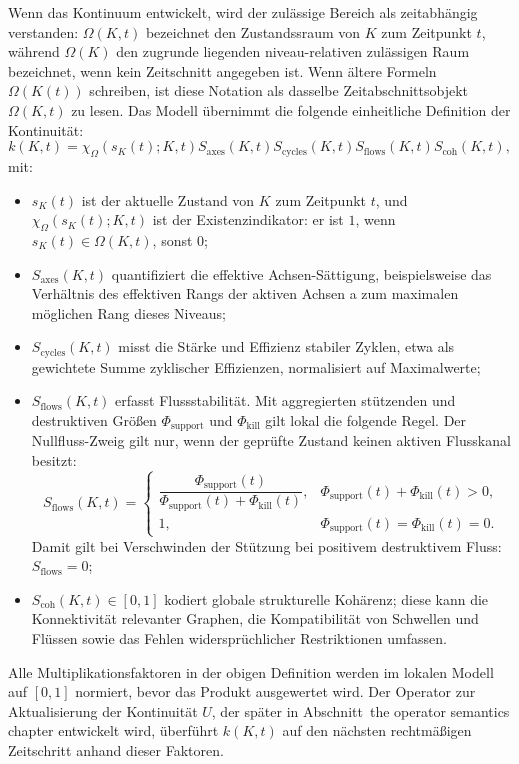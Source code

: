 Wenn das Kontinuum entwickelt, wird der zulässige Bereich als zeitabhängig
verstanden:
\(\Omega(K,t)\) bezeichnet den Zustandssraum von \(K\) zum Zeitpunkt
\(t\), während \(\Omega(K)\) den zugrunde liegenden
niveau-relativen zulässigen Raum bezeichnet, wenn kein Zeitschnitt angegeben ist.
Wenn ältere Formeln \(\Omega(K(t))\) schreiben, ist diese Notation als dasselbe
Zeitabschnittsobjekt \(\Omega(K,t)\) zu lesen.
Das Modell übernimmt die folgende einheitliche Definition der Kontinuität:
\[
    k(K,t)
    = \chi_{\Omega}(s_K(t);K,t)
      S_{\mathrm{axes}}(K,t)
      S_{\mathrm{cycles}}(K,t)
      S_{\mathrm{flows}}(K,t)
      S_{\mathrm{coh}}(K,t),
\]
mit:
\begin{itemize}
    \item \(s_K(t)\) ist der aktuelle Zustand von \(K\) zum Zeitpunkt \(t\),
          und \(\chi_{\Omega}(s_K(t);K,t)\) ist der Existenzindikator:
          er ist \(1\), wenn \(s_K(t)\in\Omega(K,t)\), sonst \(0\);
    \item \(S_{\mathrm{axes}}(K,t)\) quantifiziert die effektive Achsen-Sättigung,
          beispielsweise das Verhältnis des effektiven Rangs der aktiven Achsen
a zum maximalen möglichen Rang dieses Niveaus;
    \item \(S_{\mathrm{cycles}}(K,t)\) misst die Stärke und Effizienz stabiler
          Zyklen, etwa als gewichtete Summe zyklischer Effizienzen,
          normalisiert auf Maximalwerte;
    \item \(S_{\mathrm{flows}}(K,t)\) erfasst Flussstabilität. Mit aggregierten
          stützenden und destruktiven Größen \(\Phi_{\mathrm{support}}\) und
          \(\Phi_{\mathrm{kill}}\) gilt lokal die folgende Regel. Der
          Nullfluss-Zweig gilt nur, wenn der geprüfte Zustand keinen aktiven
          Flusskanal besitzt:
          \[
              S_{\mathrm{flows}}(K,t)=
              \begin{cases}
              \dfrac{\Phi_{\mathrm{support}}(t)}
                    {\Phi_{\mathrm{support}}(t)+\Phi_{\mathrm{kill}}(t)},
                    & \Phi_{\mathrm{support}}(t)+\Phi_{\mathrm{kill}}(t)>0,\\[0.7em]
              1, & \Phi_{\mathrm{support}}(t)=\Phi_{\mathrm{kill}}(t)=0.
              \end{cases}
          \]
          Damit gilt bei Verschwinden der Stützung bei positivem destruktivem Fluss:
          \(S_{\mathrm{flows}}=0\);
    \item \(S_{\mathrm{coh}}(K,t)\in[0,1]\) kodiert globale
          strukturelle Kohärenz; diese kann die Konnektivität relevanter Graphen,
          die Kompatibilität von Schwellen und Flüssen sowie das Fehlen
          widersprüchlicher Restriktionen umfassen.
\end{itemize}
Alle Multiplikationsfaktoren in der obigen Definition werden im lokalen Modell auf
\([0,1]\) normiert, bevor das Produkt ausgewertet wird.
Der Operator zur Aktualisierung der Kontinuität \(U\), der später in
Abschnitt~the operator semantics chapter entwickelt wird, überführt \(k(K,t)\) auf
den nächsten rechtmäßigen Zeitschritt anhand dieser Faktoren.

